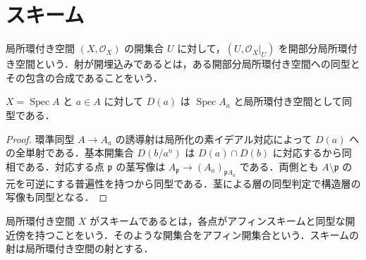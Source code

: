 \section{スキーム}
\begin{defn}[開部分局所環付き空間]
局所環付き空間 $(X,\mathcal O_X)$ の開集合 $U$ に対して，$(U,\mathcal O_X|_U)$ を開部分局所環付き空間という．射が開埋込みであるとは，ある開部分局所環付き空間への同型とその包含の合成であることをいう．
\end{defn}
\begin{prop}[基本開集合のアフィン性]
$X=\operatorname{Spec}A$ と $a\in A$ に対して $D(a)$ は $\operatorname{Spec}A_a$ と局所環付き空間として同型である．
\end{prop}
\begin{proof}
環準同型 $A\to A_a$ の誘導射は局所化の素イデアル対応によって $D(a)$ への全単射である．基本開集合 $D(b/a^n)$ は $D(a)\cap D(b)$ に対応するから同相である．対応する点 $\mathfrak p$ の茎写像は $A_{\mathfrak p}\to(A_a)_{\mathfrak p A_a}$ である．両側とも $A\setminus\mathfrak p$ の元を可逆にする普遍性を持つから同型である．茎による層の同型判定で構造層の写像も同型となる．
\end{proof}
\begin{defn}[スキーム]
局所環付き空間 $X$ がスキームであるとは，各点がアフィンスキームと同型な開近傍を持つことをいう．そのような開集合をアフィン開集合という．スキームの射は局所環付き空間の射とする．
\end{defn}
